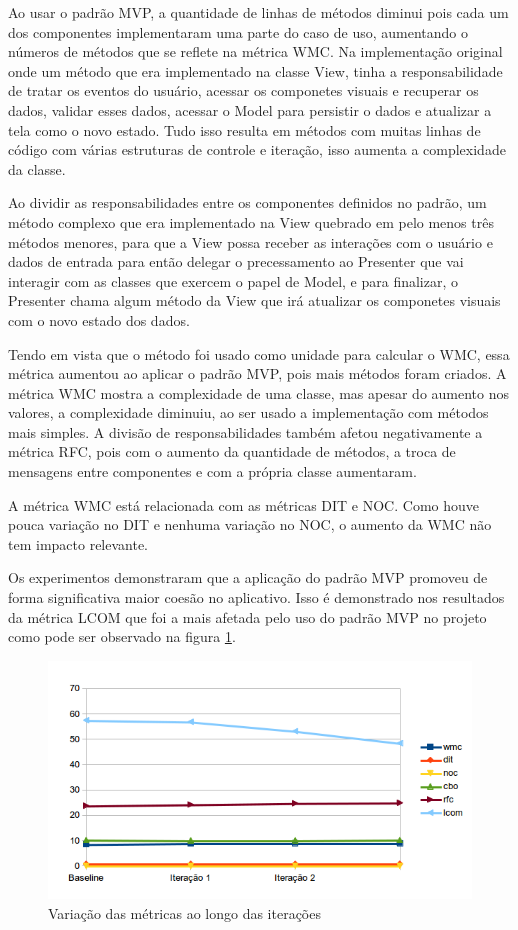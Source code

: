 \documentclass[conference]{IEEEtran}
\begin{document}
Ao usar o padrão MVP, a quantidade de linhas de métodos diminui pois cada um
dos componentes implementaram uma parte do caso de uso, aumentando o números de
métodos que se reflete na métrica WMC. Na implementação original onde um método
que era implementado na classe View, tinha a  responsabilidade de tratar os
eventos do usuário, acessar os componetes visuais e recuperar os dados, validar
esses dados, acessar o Model para persistir o dados e atualizar a tela como o
novo estado. Tudo isso resulta em métodos com muitas linhas de código com várias
estruturas de controle e iteração, isso aumenta a complexidade da classe.

Ao dividir as responsabilidades entre os componentes definidos no padrão, um
método complexo que era implementado na View quebrado em pelo menos três métodos
menores, para que a View possa receber as interações com o usuário e dados de
entrada para então delegar o precessamento ao Presenter que vai interagir com as
classes que exercem o papel de Model, e para finalizar, o Presenter chama algum
método da View que irá atualizar os componetes visuais com o novo estado dos
dados.

Tendo em vista que o método foi usado como unidade para calcular o WMC, essa
métrica aumentou ao aplicar o padrão MVP, pois mais métodos foram criados. A
métrica WMC mostra a complexidade de uma classe, mas apesar do aumento nos
valores, a complexidade diminuiu, ao ser usado a implementação com métodos mais
simples.
A divisão de responsabilidades também afetou negativamente a métrica RFC, pois
com o aumento da quantidade de métodos, a troca de mensagens entre componentes
e com a própria classe aumentaram.  


A métrica WMC está relacionada com as métricas DIT e NOC. Como houve pouca
variação no DIT e nenhuma variação no NOC, o aumento da WMC não tem impacto
relevante.

Os experimentos demonstraram que a aplicação do padrão MVP promoveu de forma
significativa maior coesão no aplicativo. Isso é demonstrado nos resultados da
métrica LCOM que foi a mais afetada pelo uso do padrão MVP no projeto como pode
ser observado na figura \ref{fig:allmetrics}.

\begin{figure}[htb]
	\includegraphics[scale=0.55]{img/allmetrics}
	\caption{\label{fig:allmetrics} Variação das métricas ao longo das iterações}
\end{figure}
\end{document}

